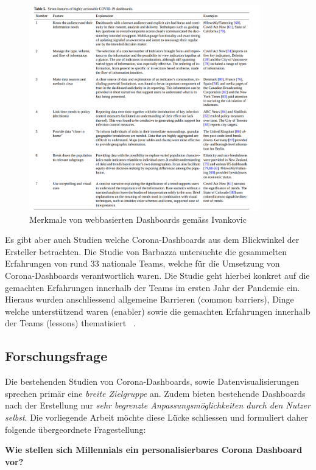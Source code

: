  \begin{figure}[ht]
    \includegraphics[width=10cm]{images/ivankovic_dashboard_characteristics.png}
    \centering
    \caption{Merkmale von webbasierten Dashboards gemäss Ivankovic ~\citep[S. 12]{ivankovic}}
\end{figure}


Es gibt aber auch Studien welche Corona-Dashboards aus dem Blickwinkel der Ersteller betrachten. Die Studie von Barbazza untersuchte die gesammelten Erfahrungen von rund 33 nationale Teams, welche für die Umsetzung von Corona-Dashboards verantwortlich waren. Die Studie geht hierbei konkret auf die gemachten Erfahrungen innerhalb der Teams im ersten Jahr der Pandemie ein. Hieraus wurden anschliessend allgemeine Barrieren (common barriers), Dinge welche unterstützend waren (enabler) sowie die gemachten Erfahrungen innerhalb der Teams (lessons) thematisiert ~\citep{barbazza}.

\subsection{Forschungsfrage}
Die bestehenden Studien von Corona-Dashboards, sowie Datenvisualisierungen sprechen primär eine \textit{breite Zielgruppe} an. Zudem bieten bestehende Dashboards nach der Erstellung nur \textit{sehr begrenzte Anpassungsmöglichkeiten durch den Nutzer selbst}. Die vorliegende Arbeit möchte diese Lücke schliessen und formuliert daher folgende übergeordnete Fragestellung:

\begin{center}
\textbf{Wie stellen sich Millennials ein personalisierbares Corona Dashboard vor?}
\end{center}

